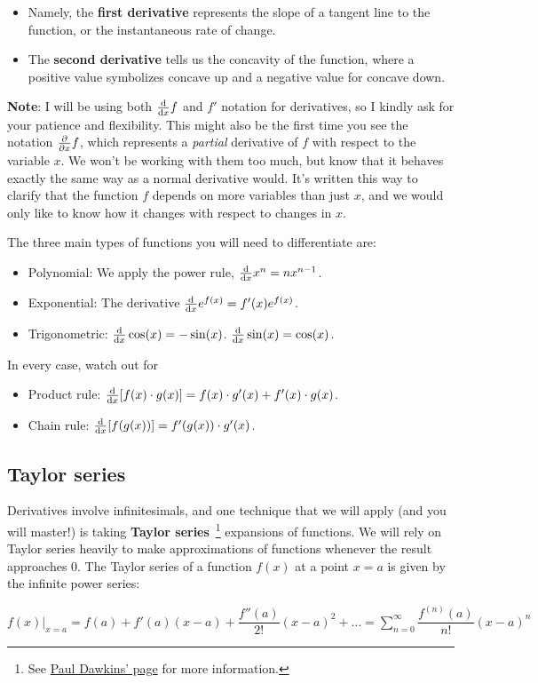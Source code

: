 \begin{itemize}
	\item Namely, the \textbf{first derivative} represents the slope of a tangent line to the function, or the instantaneous rate of change.
	
	\item The \textbf{second derivative} tells us the concavity of the function, where a positive value symbolizes concave up and a negative value for concave down.	
\end{itemize} 

\textbf{Note}: I will be using both $\dv{x} f$ and $f'$ notation for derivatives, so I kindly ask for your patience and flexibility. This might also be the first time you see the notation $\pdv{x} f$, which represents a \emph{partial} derivative of $f$ with respect to the variable $x$. We won't be working with them too much, but know that it behaves exactly the same way as a normal derivative would. It's written this way to clarify that the function $f$ depends on more variables than just $x$, and we would only like to know how it changes with respect to changes in $x$. 

The three main types of functions you will need to differentiate are:
\begin{itemize}
	\item Polynomial: We apply the power rule, $\dv{x} x^n = nx^{n-1}$.
	\item Exponential: The derivative $ \dv{x} e^{f(x)} = f'(x)e^{f(x)}$.
	\item Trigonometric: $\dv{x} \cos(x) = -\sin(x)$. $\dv{x} \sin(x) = \cos(x)$. 
\end{itemize}

In every case, watch out for 
\begin{itemize}
	\item Product rule: $\dv{x} [f(x)\cdot g(x)] = f(x)\cdot g'(x) + f'(x)\cdot g(x)$.
	\item Chain rule: $\dv{x} [f(g(x))] = f'(g(x)) \cdot g'(x)$.
\end{itemize}


\subsection{Taylor series}

Derivatives involve infinitesimals, and one technique that we will apply (and you will master!) is taking \textbf{Taylor series}~\footnote{See \href{http://tutorial.math.lamar.edu/Classes/CalcII/TaylorSeries.aspx}{Paul Dawkins' page} for more information.} expansions of functions. We will rely on Taylor series heavily to make approximations of functions whenever the result approaches 0. The Taylor series of a function $f(x)$ at a point $x=a$ is given by the infinite power series:
\begin{tcolorbox}[title=Taylor series formula]
$f(x)|_{x=a} = f(a) + f'(a)(x-a) + \dfrac{f''(a)}{2!}(x-a)^2 + \dots = \displaystyle\sum_{n=0}^{\infty} \dfrac{f^{(n)}(a)}{n!}(x-a)^n$
\end{tcolorbox}


